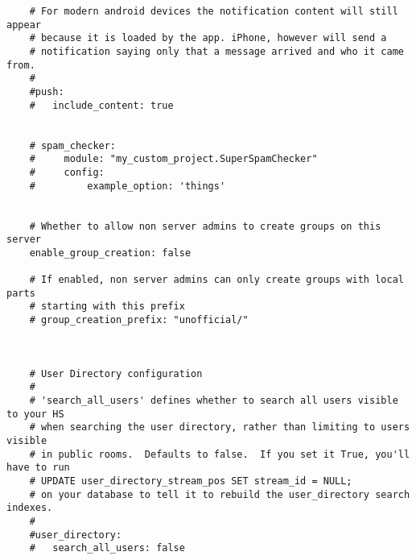 \begin{lstlisting}
    # For modern android devices the notification content will still appear
    # because it is loaded by the app. iPhone, however will send a
    # notification saying only that a message arrived and who it came from.
    #
    #push:
    #   include_content: true
    
    
    # spam_checker:
    #     module: "my_custom_project.SuperSpamChecker"
    #     config:
    #         example_option: 'things'
    
    
    # Whether to allow non server admins to create groups on this server
    enable_group_creation: false
    
    # If enabled, non server admins can only create groups with local parts
    # starting with this prefix
    # group_creation_prefix: "unofficial/"
    
    
    
    # User Directory configuration
    #
    # 'search_all_users' defines whether to search all users visible to your HS
    # when searching the user directory, rather than limiting to users visible
    # in public rooms.  Defaults to false.  If you set it True, you'll have to run
    # UPDATE user_directory_stream_pos SET stream_id = NULL;
    # on your database to tell it to rebuild the user_directory search indexes.
    #
    #user_directory:
    #   search_all_users: false
\end{lstlisting}
\newpage
{}

